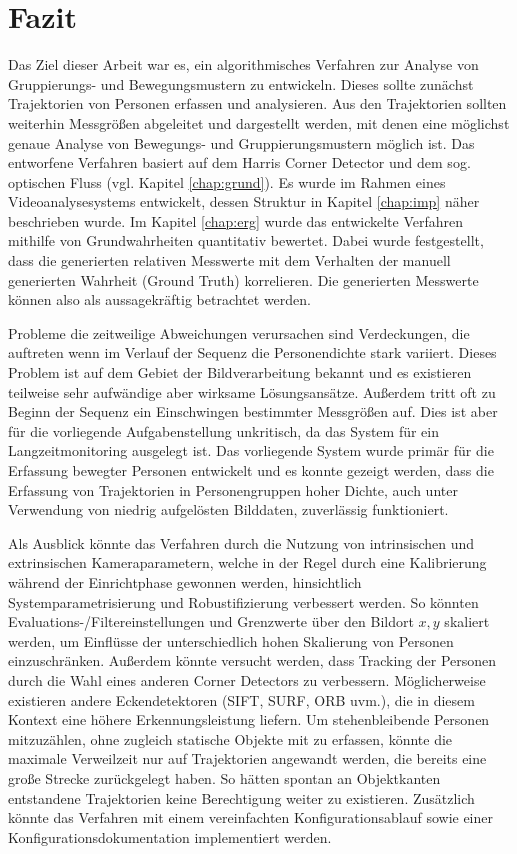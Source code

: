 \chapter{Fazit}
\label{chap:faz}
Das Ziel dieser Arbeit war es, ein algorithmisches Verfahren zur Analyse von Gruppierungs- und Bewegungsmustern zu entwickeln. Dieses sollte zunächst Trajektorien von Personen erfassen und analysieren. Aus den Trajektorien sollten weiterhin Messgrößen abgeleitet und dargestellt werden, mit denen eine möglichst genaue Analyse von Bewegungs- und Gruppierungsmustern möglich ist. Das entworfene Verfahren basiert auf dem Harris Corner Detector und dem sog. optischen Fluss (vgl. Kapitel \ref{chap:grund}). Es wurde im Rahmen eines Videoanalysesystems entwickelt, dessen Struktur in Kapitel \ref{chap:imp} näher beschrieben wurde. Im Kapitel \ref{chap:erg} wurde das entwickelte Verfahren mithilfe von Grundwahrheiten quantitativ bewertet. Dabei wurde festgestellt, dass die generierten relativen Messwerte mit dem Verhalten der manuell generierten Wahrheit (Ground Truth) korrelieren. Die generierten Messwerte können also als aussagekräftig betrachtet werden. 

Probleme die zeitweilige Abweichungen verursachen sind \zb Verdeckungen, die auftreten wenn im Verlauf der Sequenz die Personendichte stark variiert. Dieses Problem ist auf dem Gebiet der Bildverarbeitung bekannt und es existieren teilweise sehr aufwändige aber wirksame Lösungsansätze. Außerdem tritt oft zu Beginn der Sequenz ein Einschwingen bestimmter Messgrößen auf. Dies ist aber für die vorliegende Aufgabenstellung unkritisch, da das System für ein Langzeitmonitoring ausgelegt ist. Das vorliegende System wurde primär für die Erfassung bewegter Personen entwickelt und es konnte gezeigt werden, dass die Erfassung von Trajektorien in Personengruppen hoher Dichte, auch unter Verwendung von niedrig aufgelösten Bilddaten, zuverlässig funktioniert.

Als Ausblick könnte das Verfahren durch die Nutzung von intrinsischen und extrinsischen Kameraparametern, welche in der Regel durch eine Kalibrierung während der Einrichtphase gewonnen werden, hinsichtlich Systemparametrisierung und Robustifizierung verbessert werden. So könnten Evaluations-/Filtereinstellungen und Grenzwerte über den Bildort $x,y$ skaliert werden, um Einflüsse der unterschiedlich hohen Skalierung von Personen einzuschränken. Außerdem könnte versucht werden, dass Tracking der Personen durch die Wahl eines anderen Corner Detectors zu verbessern. 
\newpage
Möglicherweise existieren andere Eckendetektoren (\zb SIFT, SURF, ORB uvm.), die in diesem Kontext eine höhere Erkennungsleistung liefern. Um stehenbleibende Personen mitzuzählen, ohne zugleich statische Objekte mit zu erfassen, könnte die maximale Verweilzeit nur auf Trajektorien angewandt werden, die bereits eine große Strecke zurückgelegt haben. So hätten spontan an Objektkanten entstandene Trajektorien keine Berechtigung weiter zu existieren. Zusätzlich könnte das Verfahren mit einem vereinfachten Konfigurationsablauf sowie einer Konfigurationsdokumentation implementiert werden.

